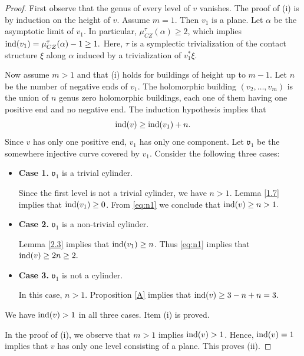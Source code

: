 \documentclass{amsart}
\newcommand{\CZ}{\mu_{CZ}^{\tau}}
\newcommand{\ind}{\textnormal{ind}}
\begin{document}
\begin{proof} First observe that the genus of every level of $v$ vanishes.
 The proof of (i) is by induction on the height of $v$. Assume $m=1$. Then $v_1$ is a plane. Let $\alpha$ be the asymptotic limit of $v_1$. In particular,  $\CZ(\alpha) \geq 2$, which implies
$\ind(v_1)=\CZ(\alpha)-1 \geq 1.$
Here, $\tau$ is a symplectic trivialization of the contact structure $\xi$ along $\alpha$ induced by a trivialization of $v_1^*\xi$.

Now assume $m>1$ and that (i) holds for buildings of height up to $m-1$. Let $n$ be the number of negative ends of $v_1$. The holomorphic building $(v_2,\ldots,v_m)$ is the union of $n$ genus zero holomorphic buildings, each one of them having one positive end  and no negative end. The induction hypothesis implies that
\begin{equation}
\ind(v) \geq \ind(v_1)+n.
\label{eq:n1}
\end{equation}
Since $v$ has only one positive end, $v_1$ has only one component. Let $\mathfrak{v}_1$ be the somewhere injective curve covered by $v_1$. Consider the following three cases:
\begin{itemize}
\item {\bf Case 1.} $\mathfrak{v}_1$ is a trivial cylinder.

Since the first level is not a trivial cylinder, we have $n>1$. Lemma \ref{1.7} implies that $\ind(v_1) \geq 0$. From \eqref{eq:n1} we conclude that
$\ind(v) \geq n > 1.$

\item {\bf Case 2.} $\mathfrak{v}_1$ is a non-trivial cylinder.

Lemma \ref{2.3} implies that $\ind(v_1) \geq n$. Thus \eqref{eq:n1} implies that 
$\ind(v) \geq 2n \geq 2.$

\item {\bf Case 3.} $\mathfrak{v}_1$ is not a cylinder.

In this case, $n>1$. Proposition \ref{A} implies that
$\ind(v) \geq 3-n+n=3.$
\end{itemize}
We have $\ind(v)>1$ in all three cases. Item (i) is proved.

In the proof of (i), we observe that  $m>1$ implies $\ind(v)>1$. Hence,  $\ind(v)=1$ implies that $v$ has only one level consisting of a plane. This proves (ii).


\end{proof}
\end{document}
